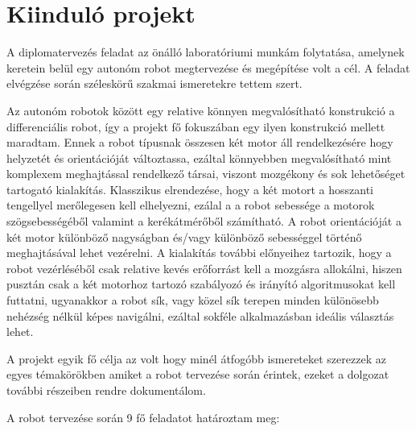 \chapter{Kiinduló projekt}




A diplomatervezés feladat az önálló laboratóriumi munkám folytatása, amelynek
keretein belül egy autonóm robot megtervezése és megépítése volt a cél.
A feladat elvégzése során széleskörű szakmai ismeretekre tettem szert. 

Az autonóm robotok között egy relative könnyen megvalósítható konstrukció a
differenciális robot, így a projekt fő fokuszában egy ilyen konstrukció  mellett
maradtam. Ennek a robot típusnak összesen két motor áll rendelkezésére hogy
helyzetét és orientációját változtassa, ezáltal  könnyebben megvalósítható mint
komplexem meghajtással rendelkező társai, viszont mozgékony és sok lehetőséget
tartogató kialakítás. Klasszikus elrendezése, hogy a két motort a hosszanti
tengellyel merőlegesen kell elhelyezni, ezálal a  a robot sebessége a motorok
szögsebességéből valamint a kerékátmérőből számítható. A robot orientációját a
két motor különböző nagyságban és/vagy különböző sebességgel történő
meghajtásával lehet vezérelni. A kialakítás további előnyeihez tartozik, hogy a
robot vezérléséből csak relative kevés erőforrást kell a mozgásra allokálni,
hiszen pusztán csak a két motorhoz tartozó szabályozó és irányító algoritmusokat
kell futtatni, ugyanakkor a robot sík, vagy közel sík terepen minden különösebb
nehézség nélkül képes navigálni, ezáltal sokféle alkalmazásban ideális választás
lehet.

A projekt egyik fő célja az volt hogy minél átfogóbb ismereteket szerezzek az
egyes témakörökben amiket a robot tervezése során érintek, ezeket a dolgozat
további részeiben rendre dokumentálom.

A robot tervezése során 9 fő feladatot határoztam meg:

